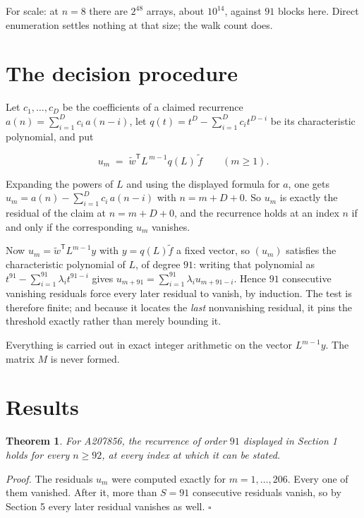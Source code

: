 \documentclass[11pt]{article}
\newtheorem{theorem}{Theorem}
\theoremstyle{definition}
\begin{document}
For scale: at $n = 8$ there are $2^{48}$ arrays, about $10^{14}$, against $91$ blocks here. Direct enumeration settles nothing at that size; the walk count does.

\section{The decision procedure}

Let $c_1,\dots,c_D$ be the coefficients of a claimed recurrence $a(n) = \sum_{i=1}^{D} c_i\,a(n-i)$, let $q(t) = t^{D} - \sum_{i=1}^{D} c_i t^{D-i}$ be its characteristic polynomial, and put

\[u_m \;=\; \tilde w^{\mathsf T} L^{\,m-1} q(L)\,\tilde f \qquad (m \ge 1).\]

Expanding the powers of $L$ and using the displayed formula for $a$, one gets $u_m = a(n) - \sum_{i=1}^{D} c_i\,a(n-i)$ with $n = m + D + 0$. So $u_m$ is exactly the residual of the claim at $n = m + D + 0$, and the recurrence holds at an index $n$ if and only if the corresponding $u_m$ vanishes.

Now $u_m = \tilde w^{\mathsf T} L^{m-1} y$ with $y = q(L)\tilde f$ a fixed vector, so $(u_m)$ satisfies the characteristic polynomial of $L$, of degree $91$: writing that polynomial as $t^{91} - \sum_{i=1}^{91} \lambda_i t^{91-i}$ gives $u_{m+91} = \sum_{i=1}^{91} \lambda_i u_{m+91-i}$. Hence $91$ consecutive vanishing residuals force every later residual to vanish, by induction. The test is therefore finite; and because it locates the {\itshape last} nonvanishing residual, it pins the threshold exactly rather than merely bounding it.

Everything is carried out in exact integer arithmetic on the vector $L^{m-1}y$. The matrix $M$ is never formed.

\section{Results}

\begin{theorem} For A207856, the recurrence of order $91$ displayed in Section 1 holds for every $n \ge 92$, at every index at which it can be stated.\end{theorem}

{\itshape Proof.} The residuals $u_m$ were computed exactly for $m = 1,\dots,206$. Every one of them vanished. After it, more than $S = 91$ consecutive residuals vanish, so by Section 5 every later residual vanishes as well. $\square$
\end{document}

